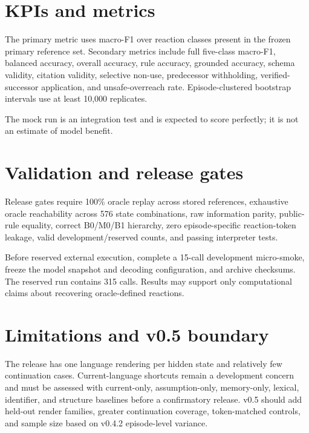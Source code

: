 \documentclass[10.5pt]{article}
\begin{document}
\section{KPIs and metrics}
The primary metric uses macro-F1 over reaction classes present in the frozen primary reference set. Secondary metrics include full five-class macro-F1, balanced accuracy, overall accuracy, rule accuracy, grounded accuracy, schema validity, citation validity, selective non-use, predecessor withholding, verified-successor application, and unsafe-overreach rate. Episode-clustered bootstrap intervals use at least 10,000 replicates.

The mock run is an integration test and is expected to score perfectly; it is not an estimate of model benefit.

\section{Validation and release gates}
Release gates require 100\% oracle replay across stored references, exhaustive oracle reachability across 576 state combinations, raw information parity, public-rule equality, correct B0/M0/B1 hierarchy, zero episode-specific reaction-token leakage, valid development/reserved counts, and passing interpreter tests.

Before reserved external execution, complete a 15-call development micro-smoke, freeze the model snapshot and decoding configuration, and archive checksums. The reserved run contains 315 calls. Results may support only computational claims about recovering oracle-defined reactions.

\section{Limitations and v0.5 boundary}
The release has one language rendering per hidden state and relatively few continuation cases. Current-language shortcuts remain a development concern and must be assessed with current-only, assumption-only, memory-only, lexical, identifier, and structure baselines before a confirmatory release. v0.5 should add held-out render families, greater continuation coverage, token-matched controls, and sample size based on v0.4.2 episode-level variance.
\end{document}
